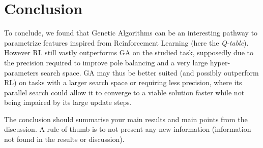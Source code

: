 \section{Conclusion}

To conclude, we found that Genetic Algorithms can be an interesting pathway to parametrize features inspired from Reinforcement Learning (here the \textit{Q-table}).
However RL still vastly outperforms GA on the studied task, supposedly due to the precision required to improve pole balancing and a very large hyper-parameters search space.
GA may thus be better suited (and possibly outperform RL) on tasks with a larger search space or requiring less precision, where its parallel search could allow it to converge to a viable solution faster while not being impaired by its large update steps.

The conclusion should summarise your main results and main points from the discussion.
A rule of thumb is to not present any new information (information not found in the results or discussion).